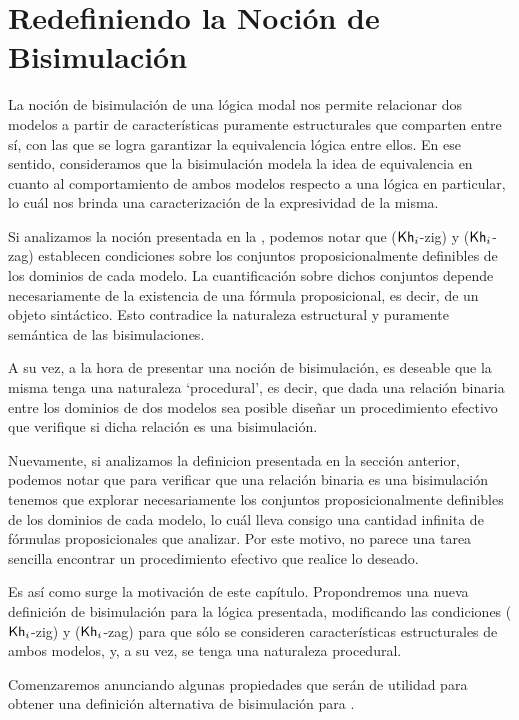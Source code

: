 \chapter{Redefiniendo la Noción de Bisimulación}

La noción de bisimulación de una lógica modal nos permite relacionar dos modelos a partir de características puramente estructurales 
que comparten entre sí, con las que se logra garantizar la equivalencia lógica entre ellos. En ese sentido, consideramos que la 
bisimulación modela la idea de equivalencia en cuanto al comportamiento de ambos modelos respecto a una lógica en particular, lo cuál nos brinda
una caracterización de la expresividad de la misma.

Si analizamos la noción presentada en la , podemos notar que ($\mathsf{Kh}_i$-zig) y ($\mathsf{Kh}_i$-zag) establecen condiciones 
sobre los conjuntos proposicionalmente definibles de los dominios de cada modelo. La cuantificación sobre dichos conjuntos depende necesariamente
de la existencia de una fórmula proposicional, es decir, de un objeto sintáctico. Esto contradice la naturaleza estructural y puramente semántica 
de las bisimulaciones. 

A su vez, a la hora de presentar una noción de bisimulación, es deseable que la misma tenga una naturaleza `procedural', es decir,
que dada una relación binaria entre los dominios de dos modelos sea posible diseñar un procedimiento efectivo que verifique si dicha relación 
es una bisimulación.

Nuevamente, si analizamos la definicion presentada en la sección anterior, podemos notar que para verificar que una relación binaria es una bisimulación
tenemos que explorar necesariamente los conjuntos proposicionalmente definibles de los dominios de cada modelo, lo cuál lleva consigo una cantidad 
infinita de fórmulas proposicionales que analizar. Por este motivo, no parece una tarea sencilla encontrar un procedimiento efectivo que realice lo deseado.

Es así como surge la motivación de este capítulo. Propondremos una nueva definición de bisimulación para la lógica presentada, modificando las condiciones
($\mathsf{Kh}_i$-zig) y ($\mathsf{Kh}_i$-zag) para que sólo se consideren características estructurales de ambos modelos, y, a su vez, se tenga una naturaleza procedural.

Comenzaremos anunciando algunas propiedades que serán de utilidad para obtener una definición alternativa de bisimulación para \KHilogic.

